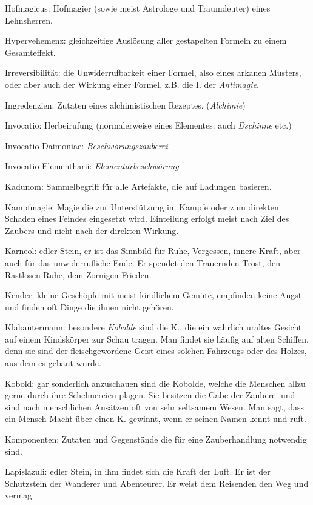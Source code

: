 \documentclass[a5paper,8pt]{book}
\begin{document}
\begin{small}
\begin{description}
 \item Hofmagicus: Hofmagier (sowie meist Astrologe und Traum­deuter) eines Lehnsherren.
 \item Hypervehemenz: gleichzeitige Auslösung aller gestapelten Formeln zu einem Gesamteffekt.
 \item Irreversibilität: die Unwiderrufbarkeit einer Formel, also eines arkanen Musters, oder aber auch der Wirkung einer Formel, z.B. die I. der \textit{Antimagie}.
 \item Ingredenzien: Zutaten eines alchimistischen Rezeptes. (\textit{Alchimie})
 \item Invocatio: Herbeirufung (normalerweise eines Elementes: auch \textit{Dschinne} etc.)
 \item Invocatio Daimoniae: \textit{Beschwörungszauberei}
 \item Invocatio Elementharii: \textit{Elementarbeschwörung}
 \item Kadunom: Sammelbegriff für alle Artefakte, die auf Ladungen basieren.
 \item Kampfmagie: Magie die zur Unterstützung im Kampfe oder zum direkten Schaden eines Feindes eingesetzt wird. Einteilung erfolgt meist nach Ziel des Zaubers und 
nicht nach der direkten Wirkung.
 \item Karneol: edler Stein, er ist das Sinn­bild für Ruhe, Vergessen, innere Kraft, aber auch für das unwiderrufliche Ende. Er spendet den Trauernden Trost, den Rastlosen
Ruhe, dem Zornigen Frieden.
 \item Kender: kleine Geschöpfe mit meist kindlichem Gemüte, empfinden keine Angst und finden oft Dinge die ihnen nicht gehören.
 \item Klabautermann: besondere \textit{Kobolde} sind die K., die ein wahrlich uraltes Gesicht auf einem Kindskörper zur Schau tragen. Man findet sie häufig auf alten 
Schiffen, denn sie sind der fleischgewordene Geist eines solchen Fahrzeugs oder des Holzes, aus dem es gebaut wurde.
 \item Kobold: gar sonderlich anzuschauen sind die Kobolde, welche die Menschen allzu gerne durch ihre Schelmereien plagen. Sie besitzen die Gabe der Zauberei und sind 
nach menschlichen Ansätzen oft von sehr seltsamem Wesen. Man sagt, dass ein Mensch Macht über einen K. gewinnt, wenn er seinen Namen kennt und ruft.
 \item Komponenten: Zutaten und Gegenstände die für eine Zauberhandlung notwendig sind.
 \item Lapislazuli: edler Stein, in ihm findet sich die Kraft der Luft. Er ist der Schutzstein der Wanderer und Abenteurer. Er weist dem Reisenden den Weg und vermag 

\end{description}
\end{small}
\end{document}
